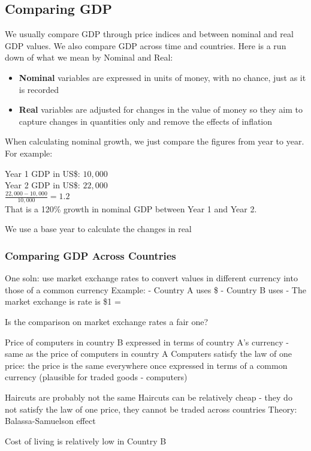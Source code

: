 \documentclass[12pt, letterpaper]{article}
\begin{document}
{\subsection{Comparing GDP}
We usually compare GDP through price indices and between nominal and real GDP values. We also compare GDP across time and countries. Here is a run down of what we mean by Nominal and Real:
\begin{itemize}
	\item \textbf{Nominal} variables are expressed in units of money, with no chance, just as it is recorded
	\item \textbf{Real} variables are adjusted for changes in the value of money so they aim to capture changes in quantities only and remove the effects of inflation
\end{itemize}
When calculating nominal growth, we just compare the figures from year to year. For example:
\begin{center}
	Year 1 GDP in US\$: $10,000$\\
	Year 2 GDP in US\$: $22,000$\\
	$\frac{22,000-10,000}{10,000} = 1.2$\\
	That is a 120\% growth in nominal GDP between Year 1 and Year 2.
\end{center}

We use a base year to calculate the changes in real

\subsubsection{Comparing GDP Across Countries}
One soln: use market exchange rates to convert values in different currency into those of a common currency
Example:
- Country A uses \$
- Country B uses \£
- The market exchange is rate is \$1 = 

Is the comparison on market exchange rates a fair one?

Price of computers in country B expressed in terms of country A's currency - same as the price of computers in country A
Computers satisfy the law of one price: the price is the same everywhere once expressed in terms of a common currency (plausible for traded goods - computers)

Haircuts are probably not the same
Haircuts can be relatively cheap - they do not satisfy the law of one price, they cannot be traded across countries
Theory: Balassa-Samuelson effect

Cost of living is relatively low in Country B

}
\end{document}
